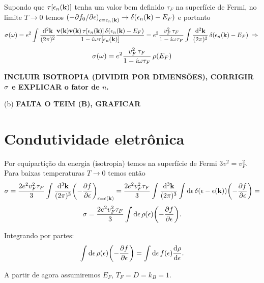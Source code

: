 \documentclass[a4paper,10pt]{article}
\begin{document}
Supondo que $\tau[\epsilon_n(\vb{k})]$ tenha um valor bem definido $\tau_F$ na superfície de Fermi, no limite $T \to 0$ temos $\qty(-\partial f_0 / \partial \epsilon)_{\epsilon = \epsilon_n(\vb{k})} \to \delta(\epsilon_n(\vb{k}) - E_F)$ e portanto
$$
\sigma(\omega) = e^2 \int \frac{\dd[2]{\vb{k}}}{(2\pi)^2}
\frac{\vb{v}(\vb{k}) \vb{v}(\vb{k}) \, \tau[\epsilon_n(\vb{k})] \, \delta(\epsilon_n(\vb{k}) - E_F)}
{1-i\omega \tau[\epsilon_n(\vb{k})]} =
e^2 \frac{v_F^2 \, \tau_F }{1-i\omega \tau_F}
\int \frac{\dd[2]{\vb{k}}}{(2\pi)^2} \, \delta(\epsilon_n(\vb{k}) - E_F) \; \Rightarrow \;
$$
$$
\sigma(\omega) = e^2 \frac{v_F^2 \, \tau_F }{1-i\omega \tau_F} \, \rho(E_F)
$$

\textbf{INCLUIR ISOTROPIA (DIVIDIR POR DIMENSÕES), CORRIGIR $\sigma$ e EXPLICAR o fator de $n$.}

(b) \textbf{FALTA O TEIM (B), GRAFICAR}


\pagebreak

\section{Condutividade eletrônica}

Por equipartição da energia (isotropia) temos na superfície de Fermi $3v^2 = v_F^2$. Para baixas temperaturas $T \to 0$ temos então
$$
\sigma = \frac{2e^2 v_F^2 \tau_F}{3} \int \frac{\dd[3]{\vb{k}}}{(2\pi)^3}
\qty(-\pdv{f}{\epsilon})_{\epsilon=\epsilon(\vb{k})} =
\frac{2e^2 v_F^2 \tau_F}{3} \int \frac{\dd[3]{\vb{k}}}{(2\pi)^3}
\int \dd{\epsilon} \delta(\epsilon - \epsilon(\vb{k})) \qty(-\pdv{f}{\epsilon}) =
$$
$$
\sigma = \frac{2e^2 v_F^2 \tau_F}{3} \int \dd{\epsilon} \rho(\epsilon) \qty(-\pdv{f}{\epsilon}).
$$

Integrando por partes:
$$
\int \dd{\epsilon} \rho(\epsilon) \qty(-\pdv{f}{\epsilon}) =
\int \dd{\epsilon} f(\epsilon) \dv{\rho}{\epsilon}.
$$

A partir de agora assumiremos $E_F$, $T_F = D = k_B = 1$.
\end{document}

